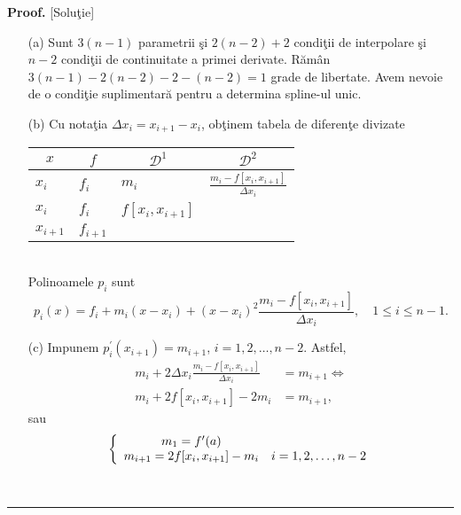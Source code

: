 \documentclass[12pt]{article}%
\newenvironment{proof}[1][Proof]{\noindent\textbf{#1.} }{\ \rule{0.5em}{0.5em}}
\begin{document}
\begin{proof}
[Solu\c{t}ie]

\begin{enumerate}
\item[(a)] Sunt $3(n-1)$ parametrii \c{s}i  $2(n-2)+2$ condi\c{t}ii de
interpolare \c{s}i $n-2$ condi\c{t}ii de continuitate a primei derivate.
R\u{a}m\^{a}n  $3(n-1)-2(n-2)-2-(n-2)=1$ grade de libertate. Avem nevoie de o
condi\c{t}ie suplimentar\u{a} pentru a determina spline-ul unic.

\item[(b)] Cu nota\c{t}ia $\Delta x_{i}=x_{i+1}-x_{i}$, ob\c{t}inem tabela de
diferen\c{t}e divizate   \newline%
\begin{tabular}
[c]{cccc}%
$x$ & $f$ & $\mathcal{D}^{1}$ & $\mathcal{D}^{2}$\\\hline
\multicolumn{1}{l}{$x_{i}$} & \multicolumn{1}{l}{$f_{i}$} &
\multicolumn{1}{l}{$m_{i}$} & \multicolumn{1}{l}{$\frac{m_{i}-f[x_{i}%
,x_{i+1}]}{\Delta x_{i}}$}\\
\multicolumn{1}{l}{$x_{i}$} & \multicolumn{1}{l}{$f_{i}$} &
\multicolumn{1}{l}{$f[x_{i},x_{i+1}]$} & \multicolumn{1}{l}{}\\
\multicolumn{1}{l}{$x_{i+1}$} & \multicolumn{1}{l}{$f_{i+1}$} &
\multicolumn{1}{l}{} & \multicolumn{1}{l}{}%
\end{tabular}
\\ Polinoamele $p_{i}$ sunt%
\[
p_{i}(x)=f_{i}+m_{i}(x-x_{i})+(x-x_{i})^{2}\frac{m_{i}-f[x_{i},x_{i+1}%
]}{\Delta x_{i}},\quad1\leq i\leq n-1.
\]


\item[(c)] Impunem $p_{i}^{\prime}(x_{i+1})=m_{i+1}$, $i=1,2,\dots,n-2$.
Astfel,
\begin{align*}
m_{i}+2\Delta x_{i}\frac{m_{i}-f[x_{i},x_{i+1}]}{\Delta x_{i}} &
=m_{i+1}\Longleftrightarrow\\
m_{i}+2f[x_{i},x_{i+1}]-2m_{i} &  =m_{i+1},
\end{align*}
sau%
\[
\left\{
\begin{array}
[c]{cc}%
m_{1}=f^{\prime}(a) & \\
m_{i+1}=2f[x_{i},x_{i+1}]-m_{i} & i=1,2,\dots,n-2
\end{array}
\right.
\]

\end{enumerate}
\end{proof}
\end{document}
